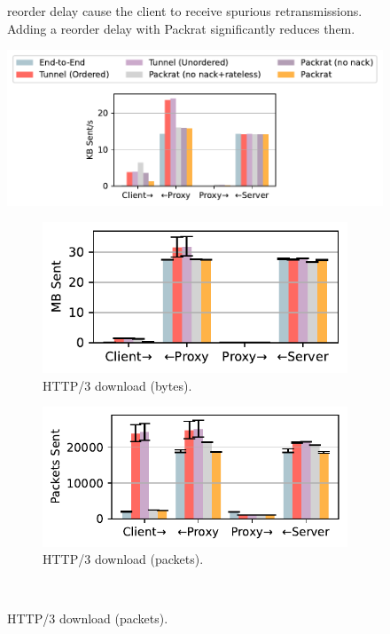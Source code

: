 \begin{figure}[ht]
\begin{minipage}[t]{0.3\textwidth}
{     reorder delay cause the client to receive spurious retransmissions.
     Adding a reorder delay with Packrat significantly reduces them.}
    \label{fig:packrat:spurious}
\end{minipage}%
\hfill
\begin{minipage}[t]{0.68\textwidth}
    \centering
    \includegraphics[width=0.9\linewidth, trim=5 140 5 5, clip]{packrat/figures/network_stats_media_legend.pdf}
    
    \begin{subfigure}[b]{0.48\linewidth}
        \centering
        \includegraphics[width=\linewidth]{packrat/figures/network_stats_http_tx_bytes.pdf}
        \caption{HTTP/3 download (bytes).}
        \label{fig:packrat:link-overheads:http-bytes}
    \end{subfigure}
    \begin{subfigure}[b]{0.51\linewidth}
        \centering
        \includegraphics[width=\linewidth]{packrat/figures/network_stats_http_tx_packets.pdf}
        \caption{HTTP/3 download (packets).}
        \label{fig:packrat:link-overheads:http-packets}
    \end{subfigure}\\


\end{minipage}
\end{figure}
